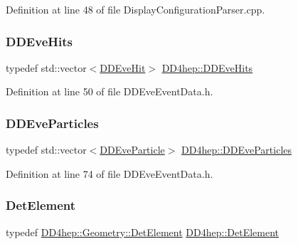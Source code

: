 Definition at line 48 of file Display\+Configuration\+Parser.\+cpp.

\hypertarget{namespace_d_d4hep_a5e3dc9e6071a76b39c0274507645600c}{}\label{namespace_d_d4hep_a5e3dc9e6071a76b39c0274507645600c} 
\subsubsection{\texorpdfstring{D\+D\+Eve\+Hits}{DDEveHits}}
{\footnotesize\ttfamily typedef std\+::vector$<$\hyperlink{class_d_d4hep_1_1_d_d_eve_hit}{D\+D\+Eve\+Hit}$>$ \hyperlink{namespace_d_d4hep_a5e3dc9e6071a76b39c0274507645600c}{D\+D4hep\+::\+D\+D\+Eve\+Hits}}



Definition at line 50 of file D\+D\+Eve\+Event\+Data.\+h.

\hypertarget{namespace_d_d4hep_a85a43876137cdbe2bd77272afb14586b}{}\label{namespace_d_d4hep_a85a43876137cdbe2bd77272afb14586b} 
\subsubsection{\texorpdfstring{D\+D\+Eve\+Particles}{DDEveParticles}}
{\footnotesize\ttfamily typedef std\+::vector$<$\hyperlink{class_d_d4hep_1_1_d_d_eve_particle}{D\+D\+Eve\+Particle}$>$ \hyperlink{namespace_d_d4hep_a85a43876137cdbe2bd77272afb14586b}{D\+D4hep\+::\+D\+D\+Eve\+Particles}}



Definition at line 74 of file D\+D\+Eve\+Event\+Data.\+h.

\hypertarget{namespace_d_d4hep_a21dd977310ff183f61ca6ae14b59a989}{}\label{namespace_d_d4hep_a21dd977310ff183f61ca6ae14b59a989} 
\subsubsection{\texorpdfstring{Det\+Element}{DetElement}}
{\footnotesize\ttfamily typedef \hyperlink{class_d_d4hep_1_1_geometry_1_1_det_element}{D\+D4hep\+::\+Geometry\+::\+Det\+Element} \hyperlink{class_d_d4hep_1_1_geometry_1_1_det_element}{D\+D4hep\+::\+Det\+Element}}



